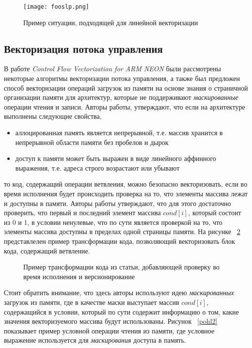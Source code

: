 \begin{figure}[!htb]
    \centering
    \texttt{[image: fooslp.png]}
    \caption{Пример ситуации, подходящей для линейной векторизации}
    \label{fooslp}
\end{figure}

\subsection{Векторизация потока управления}
В работе \textit{Control Flow Vectorization for ARM NEON} \cite{pohl2018control} были рассмотрены некоторые алгоритмы векторизации потока управления, а также был предложен способ векторизации операций загрузок из памяти на основе знания о страничной организации памяти для архитектур, которые не поддерживают \textit{маскированные} \cite{intel2017architecture} операции чтения и записи. Авторы работы, утверждают, что если на архитектуре выполнены следующие свойства,

\begin{itemize}
    \item аллоцированная память является непрерывной, т.е. массив хранится в непрерывной области памяти без пробелов и дырок
    \item доступ к памяти может быть выражен в виде линейного аффинного выражения, т.е. адреса строго возрастают или убывают
\end{itemize}

то код, содержащий операции ветвления, можно безопасно векторизовать, если во время исполнения будет происходить проверка на то, что элементы массива лежат и доступны в памяти. Авторы работы утверждают, что для этого достаточно проверить, что первый и последний элемент массива $cond[i]$, который состоит из 0 и 1, в условии ненулевые, что по сути является проверкой на то, что элементы массива доступны в пределах одной страницы памяти. На рисунке ~\ref{pohl1} представлелен пример трансформации кода, позволяющий векторизовать блок кода, содержащий ветвление.

\begin{figure}[!htb]
    \centering
    
    \caption{Пример трансформации кода из статьи, добавляющей проверку во время исполнения и версионирование}
    \label{pohl1}
\end{figure}

Стоит обратить внимание, что здесь авторы используют идею \textit{маскированных} загрузок из памяти, где в качестве маски выступает массив $cond[i]$, содержащийся в условии, который по сути содержит информацию о том, какие значения векторизуемого массива будут использованы. Рисунок ~\ref{pohl2} показывает пример условной операции чтения из памяти, где условное выражение используется для \textit{маскирования} доступа в память.

